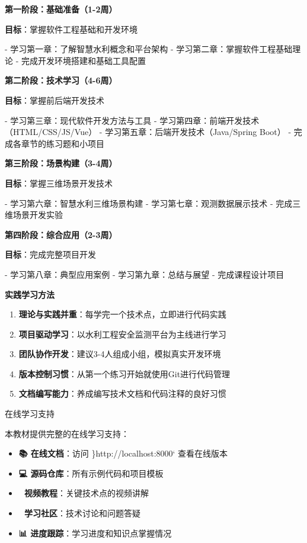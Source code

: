 \begin{tcolorbox}[colback=blue!5!white,colframe=blue!75!black,title=推荐学习路径]
\textbf{第一阶段：基础准备（1-2周）}

\textbf{目标}：掌握软件工程基础和开发环境

- 学习第一章：了解智慧水利概念和平台架构
- 学习第二章：掌握软件工程基础理论
- 完成开发环境搭建和基础工具配置

\textbf{第二阶段：技术学习（4-6周）}

\textbf{目标}：掌握前后端开发技术

- 学习第三章：现代软件开发方法与工具
- 学习第四章：前端开发技术（HTML/CSS/JS/Vue）
- 学习第五章：后端开发技术（Java/Spring Boot）
- 完成各章节的练习题和小项目

\textbf{第三阶段：场景构建（3-4周）}

\textbf{目标}：掌握三维场景开发技术

- 学习第六章：智慧水利三维场景构建
- 学习第七章：观测数据展示技术
- 完成三维场景开发实验

\textbf{第四阶段：综合应用（2-3周）}

\textbf{目标}：完成完整项目开发

- 学习第八章：典型应用案例
- 学习第九章：总结与展望
- 完成课程设计项目
\end{tcolorbox}

\textbf{实践学习方法}

\begin{enumerate}
\def\labelenumi{\arabic{enumi}.}
\tightlist
\item
  \textbf{理论与实践并重}：每学完一个技术点，立即进行代码实践
\item
  \textbf{项目驱动学习}：以水利工程安全监测平台为主线进行学习
\item
  \textbf{团队协作开发}：建议3-4人组成小组，模拟真实开发环境
\item
  \textbf{版本控制习惯}：从第一个练习开始就使用Git进行代码管理
\item
  \textbf{文档编写能力}：养成编写技术文档和代码注释的良好习惯
\end{enumerate}

 在线学习支持

本教材提供完整的在线学习支持：

\begin{itemize}
\tightlist
\item
  \textbf{📚 在线文档}：访问 \}http://localhost:8000` 查看在线版本
\item
  \textbf{💻 源码仓库}：所有示例代码和项目模板
\item
  \textbf{🎥 视频教程}：关键技术点的视频讲解\\
\item
  \textbf{💬 学习社区}：技术讨论和问题答疑
\item
  \textbf{📊 进度跟踪}：学习进度和知识点掌握情况
\end{itemize}

